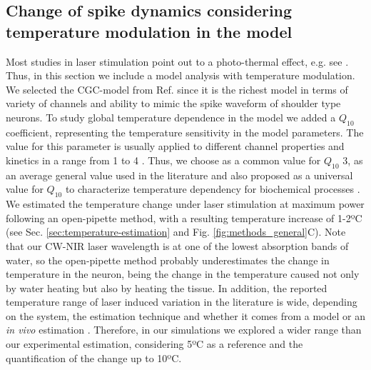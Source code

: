 \subsection{Change of spike dynamics considering temperature modulation in the model}
\label{sect:temperature model}
Most studies in laser stimulation point out to a photo-thermal effect, e.g. see \parencite{wells_biophysical_2007, shapiro_infrared_2012, li_temporal_2013, rabbitt_heat_2016, ganguly_modeling_2016, cury_infrared_2021, pan_infrared_2023}. Thus, in this section we include a model analysis with temperature modulation. We selected the CGC-model from Ref. \parencite{vavoulis_balanced_2010} since it is the richest model in terms of variety of channels and ability to mimic the spike waveform of shoulder type neurons. To study global temperature dependence in the model we added a $Q_{10}$ coefficient, representing the temperature sensitivity in the model parameters. The value for this parameter is usually applied to different channel properties and kinetics in a range from 1 to 4 \parencite{schauf_temperature_1973,cosens_temperature-dependence_1976,tang_precise_2010,alonso_temperature_2020}. 
Thus, we choose as a common value for $Q_{10}$ 3, as an average general value used in the literature \parencite{hodgkin_effect_1949,heitler_effect_1998,shapiro_infrared_2012, li_temporal_2013, rabbitt_heat_2016,ganguly_thermal_2019-1} and also proposed as a universal value for $Q_{10}$ to characterize temperature dependency for biochemical processes \parencite{elias_universality_2014}. We estimated the temperature change under laser stimulation at maximum power following an open-pipette method, with a resulting temperature increase of 1-2ºC (see Sec. \ref{sec:temperature-estimation} and Fig. \ref{fig:methods_general}C). Note that our CW-NIR laser wavelength is at one of the lowest absorption bands of water, so the open-pipette method probably underestimates the change in temperature in the neuron, being the change in the temperature caused not only by water heating but also by heating the tissue. In addition, the reported temperature range of laser induced variation in the literature is wide, depending on the system, the estimation technique and whether it comes from a model or an \textit{in vivo} estimation \parencite{shapiro_infrared_2012, rabbitt_heat_2016, thompson_modeling_2012}. Therefore, in our simulations we explored a wider range than our experimental estimation, considering 5ºC as a reference and the quantification of the change up to 10ºC.

